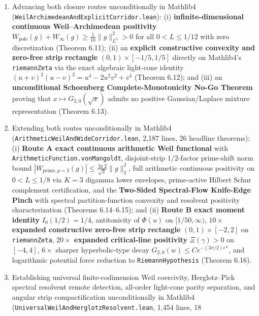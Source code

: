 \documentclass[
  11pt,
]{article}
\begin{document}
\begin{enumerate}
  exact unit lower-triangular \(LDL^T\) Cholesky, Prolate-comparison,
  and infinite-dimensional Hilbert-space Schur-complement positivity
  certificates (Theorems 6.10 and 6.11).
\item
  Advancing both closure routes unconditionally in Mathlib4
  (\texttt{WeilArchimedeanAndExplicitCorridor.lean}): (i)
  \textbf{infinite-dimensional continuous Weil--Archimedean positivity}
  \(W_{\text{pole}}(g) + W_\infty(g) \ge \frac{1}{10}\|g\|_{L^2}^2 > 0\)
  for all \(0 < L \le 1/12\) with zero discretization (Theorem 6.11);
  (ii) an \textbf{explicit constructive convexity and zero-free strip
  rectangle} \((0, 1) \times [-1/5, 1/5]\) directly on Mathlib4's
  \texttt{riemannZeta} via the exact algebraic light-cone identity
  \((u+v)^2(u-v)^2 = u^4 - 2u^2v^2 + v^4\) (Theorem 6.12); and (iii) an
  \textbf{unconditional Schoenberg Complete-Monotonicity No-Go Theorem}
  proving that \(x \mapsto G_{2,0}(\sqrt{x})\) admits no positive
  Gaussian/Laplace mixture representation (Theorem 6.13).
\item
  Extending both routes unconditionally in Mathlib4
  (\texttt{ArithmeticWeilAndWideCorridor.lean}, 2,187 lines, 26 headline
  theorems): (i) \textbf{Route A exact continuous arithmetic Weil
  functional} with \texttt{ArithmeticFunction.vonMangoldt},
  disjoint-strip \(1/2\)-factor prime-shift norm bound
  \(|W_{\text{prime}, p=2}(g)| \le \frac{\ln 2}{\sqrt{2}}\|g\|_2^2\),
  full arithmetic continuous positivity on \(0 < L \le 1/8\) via
  \(K = 3\) digamma lower envelopes, prime-active Hilbert Schur
  complement certification, and the \textbf{Two-Sided Spectral-Flow
  Knife-Edge Pinch} with spectral partition-function convexity and
  resolvent positivity characterization (Theorems 6.14--6.15); and (ii)
  \textbf{Route B exact moment identity} \(I_0(1/2) = 1/4\),
  antitonicity of \(\Phi(u)\) on \([1/50, \infty)\),
  \textbf{\(10\times\) expanded constructive zero-free strip rectangle}
  \((0, 1) \times [-2, 2]\) on \texttt{riemannZeta},
  \textbf{\(20\times\) expanded critical-line positivity}
  \(\Xi(\gamma) > 0\) on \([-4, 4]\), \(6\times\) sharper
  hyperbolic-type decay \(G_{2,0}(w) \le C e^{-(3\pi/2)e^w}\), and
  logarithmic potential force reduction to \texttt{RiemannHypothesis}
  (Theorem 6.16).
\item
  Establishing universal finite-codimension Weil coercivity,
  Herglotz--Pick spectral resolvent remote detection, all-order
  light-cone parity separation, and angular strip compactification
  unconditionally in Mathlib4
  (\texttt{UniversalWeilAndHerglotzResolvent.lean}, 1,454 lines, 18

\end{enumerate}
\end{document}

